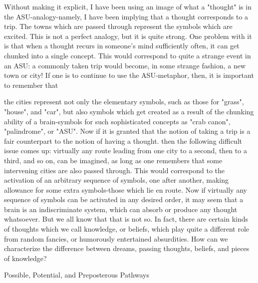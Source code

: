 Without making it explicit, I have been using an image of what a "thought" is in the
ASU-analogy-namely, I have been implying that a thought corresponds to a trip. The
towns which are passed through represent the symbols which are excited. This is not a
perfect analogy, but it is quite strong. One problem with it is that when a thought recurs
in someone's mind sufficiently often, it can get chunked into a single concept. This would
correspond to quite a strange event in an ASU: a commonly taken trip would become, in
some strange fashion, a new town or city! If one is to continue to use the ASU-metaphor,
then, it is important to remember that





the cities represent not only the elementary symbols, such as those for "grass", "house",
and "car", but also symbols which get created as a result of the chunking ability of a
brain-symbols for such sophisticated concepts as "crab canon", "palindrome", or "ASU".
        Now if it is granted that the notion of taking a trip is a fair counterpart to the
notion of having a thought. then the following difficult issue comes up: virtually any
route leading from one city to a second, then to a third, and so on, can be imagined, as
long as one remembers that some intervening cities are also passed through. This would
correspond to the activation of an arbitrary sequence of symbols, one after another,
making allowance for some extra symbols-those which lie en route. Now if virtually any
sequence of symbols can be activated in any desired order, it may seem that a brain is an
indiscriminate system, which can absorb or produce any thought whatsoever. But we all
know that that is not so. In fact, there are certain kinds of thoughts which we call
knowledge, or beliefs, which play quite a different role from random fancies, or
humorously entertained absurdities. How can we characterize the difference between
dreams, passing thoughts, beliefs, and pieces of knowledge?

                   Possible, Potential, and Preposterous Pathways

